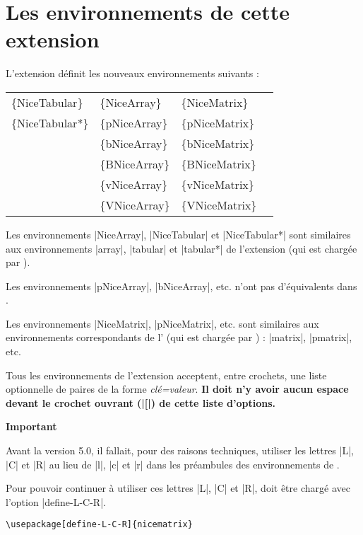 \documentclass[dvipsnames]{article}%
\begin{document}
\newpage

\section{Les environnements de cette extension} 

L'extension  définit les nouveaux environnements suivants :

\medskip
\begin{ttfamily}
\setlength{\tabcolsep}{3mm}
\begin{tabular}{llll}
\{NiceTabular\}  & \{NiceArray\}  & \{NiceMatrix\}   \\
\{NiceTabular*\} & \{pNiceArray\} & \{pNiceMatrix\}  \\
               & \{bNiceArray\} & \{bNiceMatrix\}  \\
               & \{BNiceArray\} & \{BNiceMatrix\}  \\
               & \{vNiceArray\} & \{vNiceMatrix\}  \\
               & \{VNiceArray\} & \{VNiceMatrix\}  
\end{tabular}
\end{ttfamily}


\medskip
Les environnements |{NiceArray}|, |{NiceTabular}| et |{NiceTabular*}| sont
similaires aux environnements |{array}|, |{tabular}| et |{tabular*}| de
l'extension  (qui est chargée par ).

\medskip
Les environnements |{pNiceArray}|, |{bNiceArray}|, etc. n'ont pas d'équivalents
dans .

\medskip
Les environnements |{NiceMatrix}|, |{pNiceMatrix}|, etc. sont similaires aux
environnements correspondants de l' (qui est chargée par
) : |{matrix}|, |{pmatrix}|, etc.

\medskip
Tous les environnements de l'extension  acceptent, entre
crochets, une liste optionnelle de paires de la forme \textsl{clé=valeur}.
{\bfseries Il doit n'y avoir aucun espace devant le crochet ouvrant (|[|) de
  cette liste d'options.}

\bigskip
\textbf{Important}

Avant la version 5.0, il fallait, pour des raisons techniques, utiliser les
lettres |L|, |C| et |R| au lieu de |l|, |c| et |r| dans les préambules des
environnements de .

Pour pouvoir continuer à utiliser ces lettres |L|, |C| et |R|, 
doit être chargé avec l'option |define-L-C-R|.
\begin{Verbatim}
\usepackage[define-L-C-R]{nicematrix}
\end{Verbatim}
\end{document}
